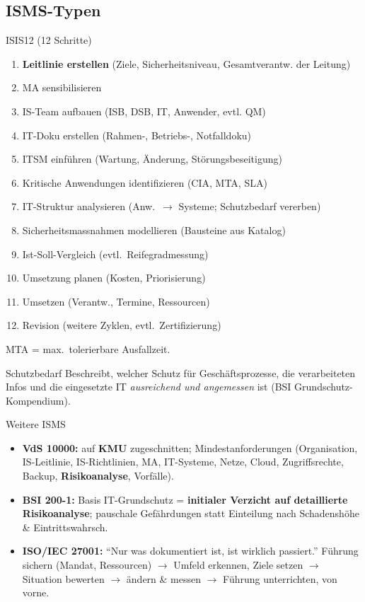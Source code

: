 \documentclass[a4paper, fontsize=7pt]{scrartcl}
\begin{document}
\subsection{ISMS-Typen}

\begin{mainbox}{ISIS12 (12 Schritte)}
\begin{enumerate}
    \item \textbf{Leitlinie erstellen} (Ziele, Sicherheitsniveau, Gesamtverantw.
          der Leitung)
    \item MA sensibilisieren
    \item IS-Team aufbauen (ISB, DSB, IT, Anwender, evtl. QM)
    \item IT-Doku erstellen (Rahmen-, Betriebs-, Notfalldoku)
    \item ITSM einführen (Wartung, Änderung, Störungsbeseitigung)
    \item Kritische Anwendungen identifizieren (CIA, MTA, SLA)
    \item IT-Struktur analysieren (Anw.\ $\to$ Systeme; Schutzbedarf vererben)
    \item Sicherheitsmassnahmen modellieren (Bausteine aus Katalog)
    \item Ist-Soll-Vergleich (evtl.\ Reifegradmessung)
    \item Umsetzung planen (Kosten, Priorisierung)
    \item Umsetzen (Verantw., Termine, Ressourcen)
    \item Revision (weitere Zyklen, evtl.\ Zertifizierung)
\end{enumerate}
MTA = max.\ tolerierbare Ausfallzeit.
\end{mainbox}

\begin{subbox}{Schutzbedarf}
Beschreibt, welcher Schutz für Geschäftsprozesse, die verarbeiteten Infos und die
eingesetzte IT \emph{ausreichend und angemessen} ist (BSI Grundschutz-Kompendium).
\end{subbox}

\begin{mainbox}{Weitere ISMS}
\begin{itemize}
    \item \textbf{VdS 10000:} auf \textbf{KMU} zugeschnitten; Mindestanforderungen
          (Organisation, IS-Leitlinie, IS-Richtlinien, MA, IT-Systeme, Netze,
          Cloud, Zugriffsrechte, Backup, \textbf{Risikoanalyse}, Vorfälle).
    \item \textbf{BSI 200-1:} Basis IT-Grundschutz = \textbf{initialer Verzicht auf
          detaillierte Risikoanalyse}; pauschale Gefährdungen statt Einteilung nach
          Schadenshöhe \& Eintrittswahrsch.
    \item \textbf{ISO/IEC 27001:} ``Nur was dokumentiert ist, ist wirklich
          passiert.'' Führung sichern (Mandat, Ressourcen) $\to$ Umfeld erkennen,
          Ziele setzen $\to$ Situation bewerten $\to$ ändern \& messen $\to$
          Führung unterrichten, von vorne.
\end{itemize}
\end{mainbox}
\end{document}
